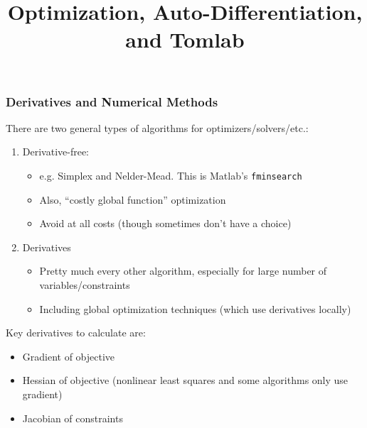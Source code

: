 \documentclass[nofootline]{etk-presentation}
\begin{document}
\title{Optimization, Auto-Differentiation, and Tomlab}
\maketitle
	\begin{frame}\frametitle{}
	\bigskip
	\bigskip
	\bigskip	
	\begin{center}
		{\huge {}}
	\end{center}
\end{frame}
\begin{frame}[fragile]	\frametitle{Derivatives and Numerical Methods}
	There are two general types of algorithms for optimizers/solvers/etc.:
	\begin{enumerate}
		\item Derivative-free:
		\begin{itemize}
			\item e.g. Simplex and Nelder-Mead.  This is Matlab's \verb|fminsearch|
			\item Also, ``costly global function'' optimization
			\item Avoid at all costs (though sometimes don't have a choice)
		\end{itemize}
	\bigskip
		\item Derivatives
		\begin{itemize}
			\item Pretty much every other algorithm, especially for large number of variables/constraints
			\item Including global optimization techniques (which use derivatives locally)
		\end{itemize}	
	\end{enumerate}
\bigskip
Key derivatives to calculate are:
\begin{itemize}
	\item Gradient of objective
	\item Hessian of objective (nonlinear least squares and some algorithms only use gradient)
	\item Jacobian of constraints
\end{itemize}


\end{frame}
\end{document}
